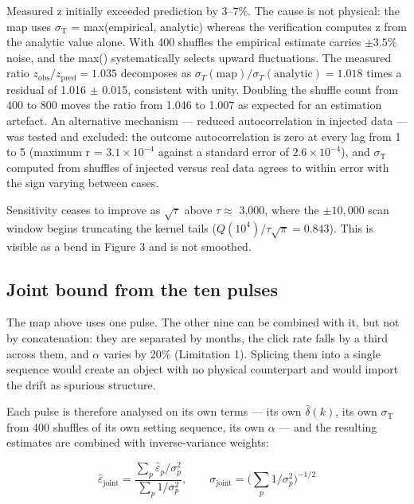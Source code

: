 \documentclass[
  11pt,
]{article}
\begin{document}
Measured z initially exceeded prediction by 3--7\%. The cause is not
physical: the map uses \(\sigma_{\mathrm{T}}\) = max(empirical,
analytic) whereas the verification computes z from the analytic value
alone. With 400 shuffles the empirical estimate carries \(\pm 3.5\)\%
noise, and the max() systematically selects upward fluctuations. The
measured ratio \(z_{\mathrm{obs}}/z_{\mathrm{pred}} = 1.035\) decomposes
as \(\sigma_T(\mathrm{map})/\sigma_T(\mathrm{analytic}) = 1.018\) times
a residual of 1.016 \(\pm\) 0.015, consistent with unity. Doubling the
shuffle count from 400 to 800 moves the ratio from 1.046 to 1.007 as
expected for an estimation artefact. An alternative mechanism ---
reduced autocorrelation in injected data --- was tested and excluded:
the outcome autocorrelation is zero at every lag from 1 to 5 (maximum
\textbar r\textbar{} = \(3.1 \times 10^{-4}\) against a standard error
of \(2.6 \times 10^{-4}\)), and \(\sigma_{\mathrm{T}}\) computed from
shuffles of injected versus real data agrees to within error with the
sign varying between cases.

Sensitivity ceases to improve as \(\sqrt\tau\) above \(\tau \approx\)
3,000, where the \(\pm 10,000\) scan window begins truncating the kernel
tails (\(Q(10^4)/\tau\sqrt{\pi} = 0.843\)). This is visible as a bend in
Figure 3 and is not smoothed.

\subsection{Joint bound from the ten pulses}

The map above uses one pulse. The other nine can be combined with it,
but not by concatenation: they are separated by months, the click rate
falls by a third across them, and \(\alpha\) varies by 20\% (Limitation
1). Splicing them into a single sequence would create an object with no
physical counterpart and would import the drift as spurious structure.

Each pulse is therefore analysed on its own terms --- its own
\(\hat\delta(k)\), its own \(\sigma_{\mathrm{T}}\) from 400 shuffles of
its own setting sequence, its own \(\alpha\) --- and the resulting
estimates are combined with inverse-variance weights:

\begin{equation}
\hat\varepsilon_{\mathrm{joint}} = \frac{\sum_p \hat\varepsilon_p/\sigma_p^2}{\sum_p 1/\sigma_p^2}, \qquad \sigma_{\mathrm{joint}} = \Big(\sum_p 1/\sigma_p^2\Big)^{-1/2}
\label{eq:joint}
\end{equation}
\end{document}
